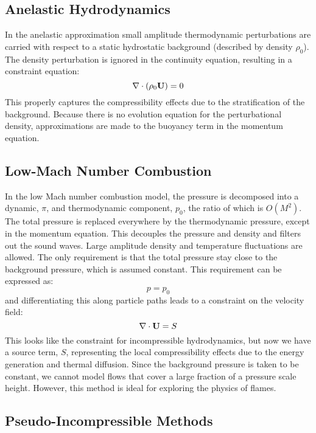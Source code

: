 \subsection{Anelastic Hydrodynamics}

In the anelastic approximation small amplitude thermodynamic
perturbations are carried with respect to a static hydrostatic
background (described by density $\rho_0$).  The density perturbation
is ignored in the continuity equation, resulting in a constraint
equation:
\begin{equation}
\nabla \cdot (\rho_0 {\bf U}) = 0
\end{equation}
This properly captures the compressibility effects due to the
stratification of the background. Because there is no evolution
equation for the perturbational density, approximations are made to
the buoyancy term in the momentum equation.

\subsection{Low-Mach Number Combustion}

In the low Mach number combustion model, the pressure is decomposed
into a dynamic, $\pi$, and thermodynamic component, $p_0$, the ratio
of which is $O(M^2)$. The total pressure is replaced everywhere by the
thermodynamic pressure, except in the momentum equation. This
decouples the pressure and density and filters out the sound
waves. Large amplitude density and temperature fluctuations are
allowed. The only requirement is that the total pressure stay close to
the background pressure, which is assumed constant. This requirement
can be expressed as:
\begin{equation}
p = p_0
\end{equation}
and differentiating this along particle paths leads to a constraint on
the velocity field: 
\begin{equation}
\nabla \cdot {\bf U} = S 
\end{equation}
This looks like the constraint for incompressible hydrodynamics, but
now we have a source term, $S$, representing the local compressibility
effects due to the energy generation and thermal diffusion.  Since the
background pressure is taken to be constant, we cannot model flows
that cover a large fraction of a pressure scale height. However, this
method is ideal for exploring the physics of flames.

\subsection{Pseudo-Incompressible Methods}

